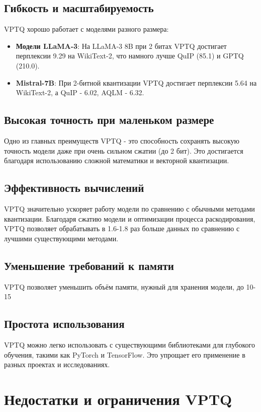 \documentclass{article}
\begin{document}
\subsection{Гибкость и масштабируемость}
VPTQ хорошо работает с моделями разного размера:
\begin{itemize}
\item \textbf{Модели LLaMA-3}: На LLaMA-3 8B при 2 битах VPTQ достигает перплексии 9.29 на WikiText-2, что намного лучше QuIP (85.1) и GPTQ (210.0).
\item \textbf{Mistral-7B}: При 2-битной квантизации VPTQ достигает перплексии 5.64 на WikiText-2, а QuIP - 6.02, AQLM - 6.32.
\end{itemize}

\subsection{Высокая точность при маленьком размере}
Одно из главных преимуществ VPTQ - это способность сохранять высокую точность модели даже при очень сильном сжатии (до 2 бит). Это достигается благодаря использованию сложной математики и векторной квантизации.
\subsection{Эффективность вычислений}
VPTQ значительно ускоряет работу модели по сравнению с обычными методами квантизации. Благодаря сжатию модели и оптимизации процесса раскодирования, VPTQ позволяет обрабатывать в 1.6-1.8 раз больше данных по сравнению с лучшими существующими методами.
\subsection{Уменьшение требований к памяти}
VPTQ позволяет уменьшить объём памяти, нужный для хранения модели, до 10-15%
\subsection{Простота использования}
VPTQ можно легко использовать с существующими библиотеками для глубокого обучения, такими как PyTorch и TensorFlow. Это упрощает его применение в разных проектах и исследованиях.

\section{Недостатки и ограничения VPTQ}
\end{document}
